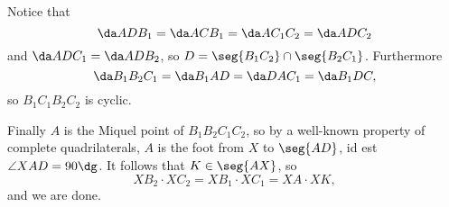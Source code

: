 Notice that \[\da ADB_1=\da ACB_1=\da AC_1C_2=\da ADC_2\]
and $\da ADC_1=\da ADB_2$, so $D=\seg{B_1C_2}\cap\seg{B_2C_1}$. Furthermore \[\da B_1B_2C_1=\da B_1AD=\da DAC_1=\da B_1DC,\]
so $B_1C_1B_2C_2$ is cyclic.

Finally $A$ is the Miquel point of $B_1B_2C_1C_2$, so by a well-known property of complete quadrilaterals, $A$ is the foot from $X$ to $\seg{AD}$, id est $\angle XAD=90\dg$. It follows that $K\in\seg{AX}$, so \[XB_2\cdot XC_2=XB_1\cdot XC_1=XA\cdot XK,\]
and we are done.


